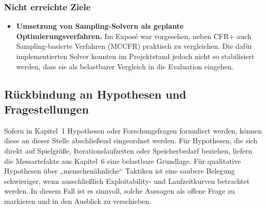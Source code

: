 \subsubsection{Nicht erreichte Ziele}
\begin{itemize}
\item \textbf{Umsetzung von Sampling-Solvern als geplante Optimierungsverfahren.}
Im Exposé war vorgesehen, neben CFR+ auch Sampling-basierte Verfahren (MCCFR) praktisch zu vergleichen.
Die dafür implementierten Solver konnten im Projektstand jedoch nicht so stabilisiert werden, dass sie als belastbarer Vergleich in die Evaluation eingehen.
\end{itemize}

\subsection{Rückbindung an Hypothesen und Fragestellungen}
Sofern in Kapitel~1 Hypothesen oder Forschungsfragen formuliert werden, können diese an dieser Stelle abschließend eingeordnet werden.
Für Hypothesen, die sich direkt auf Spielgröße, Iterationslaufzeiten oder Speicherbedarf beziehen, liefern die Messartefakte aus Kapitel~6 eine belastbare Grundlage.
Für qualitative Hypothesen über „menschenähnliche“ Taktiken ist eine saubere Belegung schwieriger, wenn ausschließlich Exploitability- und Laufzeitkurven betrachtet werden.
In diesem Fall ist es sinnvoll, solche Aussagen als offene Frage zu markieren und in den Ausblick zu verschieben.

